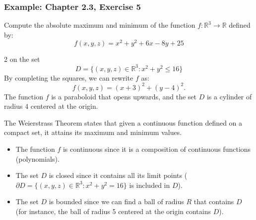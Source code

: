 \documentclass[11pt]{article}
\begin{document}
\subsubsection*{Example: Chapter 2.3, Exercise 5}
Compute the absolute maximum and minimum of the function \(f : \mathbb{R}^3 \to \mathbb{R}\) defined by:
\[f(x, y, z) = x^2 + y^2 + 6x - 8y + 25\]
\begin{multicols}{2}
on the set 
\[D = \{(x, y, z) \in \mathbb{R}^3 : x^2 + y^2 \leq 16 \}\]
By completing the squares, we can rewrite \(f\) as:
\[f(x, y, z) = (x + 3)^2 + (y - 4)^2.\]
The function \(f\) is a paraboloid that opens upwards, and the set \(D\) is a cylinder of radius 4 centered at the origin. 

\begin{center}
\end{center}

\end{multicols}

The Weierstrass Theorem states that given a continuous function defined on a compact set, it attains its maximum and minimum values. 

\begin{itemize}
    \item The function \(f\) is continuous since it is a composition of continuous functions (polynomials).
    \item The set \(D\) is closed since it contains all its limit points (\(\partial D = \{(x, y, z) \in \mathbb{R}^3 : x^2 + y^2 = 16\}\) is included in \(D\)).
    \item The set \(D\) is bounded since we can find a ball of radius \(R\) that contains \(D\) (for instance, the ball of radius 5 centered at the origin contains \(D\)).
\end{itemize}
\end{document}
